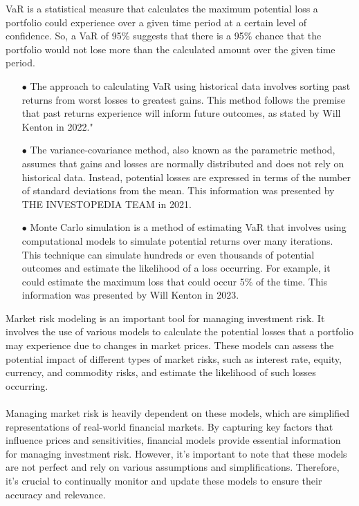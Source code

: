 VaR is a statistical measure that calculates the maximum potential loss a portfolio could experience
over a given time period at a certain level of confidence. So, a VaR of 95\% suggests that there is a 95\%
chance that the portfolio would not lose more than the calculated amount over the given time period.
\begin{itemize}
    \item[$\bullet$]	The approach to calculating VaR using historical data involves sorting past returns from 
    worst losses to greatest gains. This method follows the premise that past returns experience will inform 
    future outcomes, as stated by Will Kenton in 2022."
    \item[$\bullet$]	The variance-covariance method, also known as the parametric method, assumes that gains and 
    losses are normally distributed and does not rely on historical data. Instead, potential losses are expressed 
    in terms of the number of standard deviations from the mean. This information was presented 
    by THE INVESTOPEDIA TEAM in 2021.
    \item[$\bullet$]	Monte Carlo simulation is a method of estimating VaR that involves using computational 
    models to simulate potential returns over many iterations. This technique can simulate hundreds or even 
    thousands of potential outcomes and estimate the likelihood of a loss occurring. For example, it could 
    estimate the maximum loss that could occur 5\% of the time. This information was presented by Will Kenton in 2023.\\
\end{itemize}
Market risk modeling is an important tool for managing investment risk. It involves the use of various models to 
calculate the potential losses that a portfolio may experience due to changes in market prices. These models can 
assess the potential impact of different types of market risks, such as interest rate, equity, currency, and 
commodity risks, and estimate the likelihood of such losses occurring.\\\\
Managing market risk is heavily dependent on these models, which are simplified representations of real-world 
financial markets. By capturing key factors that influence prices and sensitivities, financial models provide 
essential information for managing investment risk. However, it's important to note that these models are not 
perfect and rely on various assumptions and simplifications. Therefore, it's crucial to continually monitor and 
update these models to ensure their accuracy and relevance.


